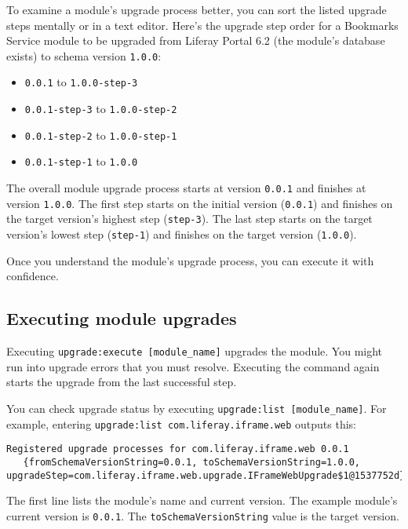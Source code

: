 To examine a module's upgrade process better, you can sort the listed
upgrade steps mentally or in a text editor. Here's the upgrade step
order for a Bookmarks Service module to be upgraded from Liferay Portal
6.2 (the module's database exists) to schema version \texttt{1.0.0}:

\begin{itemize}
\tightlist
\item
  \texttt{0.0.1} to \texttt{1.0.0-step-3}
\item
  \texttt{0.0.1-step-3} to \texttt{1.0.0-step-2}
\item
  \texttt{0.0.1-step-2} to \texttt{1.0.0-step-1}
\item
  \texttt{0.0.1-step-1} to \texttt{1.0.0}
\end{itemize}

The overall module upgrade process starts at version \texttt{0.0.1} and
finishes at version \texttt{1.0.0}. The first step starts on the initial
version (\texttt{0.0.1}) and finishes on the target version's highest
step (\texttt{step-3}). The last step starts on the target version's
lowest step (\texttt{step-1}) and finishes on the target version
(\texttt{1.0.0}).

Once you understand the module's upgrade process, you can execute it
with confidence.

\subsection{Executing module upgrades}\label{executing-module-upgrades}

Executing \texttt{upgrade:execute\ {[}module\_name{]}} upgrades the
module. You might run into upgrade errors that you must resolve.
Executing the command again starts the upgrade from the last successful
step.

You can check upgrade status by executing
\texttt{upgrade:list\ {[}module\_name{]}}. For example, entering
\texttt{upgrade:list\ com.liferay.iframe.web} outputs this:

\begin{verbatim}
Registered upgrade processes for com.liferay.iframe.web 0.0.1
   {fromSchemaVersionString=0.0.1, toSchemaVersionString=1.0.0, upgradeStep=com.liferay.iframe.web.upgrade.IFrameWebUpgrade$1@1537752d}
\end{verbatim}

The first line lists the module's name and current version. The example
module's current version is \texttt{0.0.1}. The
\texttt{toSchemaVersionString} value is the target version.

